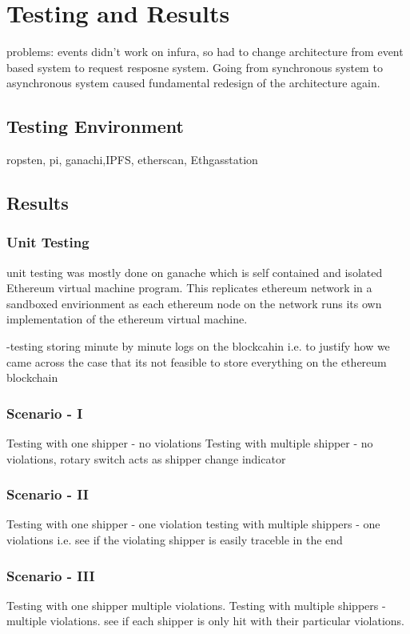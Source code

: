 \section{Testing and Results}
problems: events didn't work on infura, so had to change architecture from event based system to request resposne system. Going from synchronous system to asynchronous system caused fundamental redesign of the architecture again. 
\subsection{Testing Environment}
ropsten, pi, ganachi,IPFS, etherscan, Ethgasstation
\subsection{Results}
\subsubsection{Unit Testing} \label{UnitTesting} 
unit testing was mostly done on ganache which is self contained and isolated Ethereum virtual machine program. This replicates ethereum network in a sandboxed envirionment as each ethereum node on the network runs its own implementation of the ethereum virtual machine.

-testing storing minute by minute logs on the blockcahin i.e. to justify how we came across the case that its not feasible to store everything on the ethereum blockchain


\subsubsection{Scenario - I}
Testing with one shipper - no violations
Testing with multiple shipper - no violations, rotary switch acts as shipper change indicator
\subsubsection{Scenario - II}
Testing with one shipper - one violation
testing with multiple shippers - one violations i.e. see if the violating shipper is easily traceble in the end
\subsubsection{Scenario - III}
Testing with one shipper multiple violations.
Testing with multiple shippers - multiple violations. see if each shipper is only hit with their particular violations.
